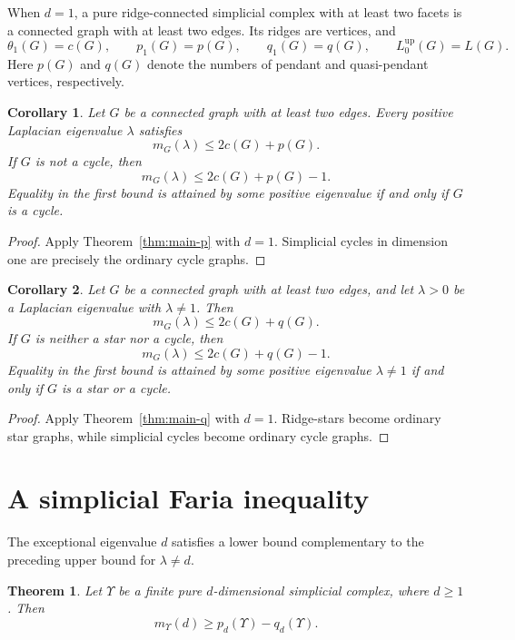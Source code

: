 \documentclass[12pt]{article}
\newtheorem{theorem}{Theorem}
\newtheorem{corollary}{Corollary}
\theoremstyle{remark}
\begin{document}
When $d=1$, a pure ridge-connected simplicial complex with at least two facets is a connected graph with at least two edges.  Its ridges are vertices, and
\[
\theta_1(G)=c(G),\qquad
p_1(G)=p(G),\qquad
q_1(G)=q(G),\qquad
L^{\mathrm{up}}_0(G)=L(G).
\]
Here $p(G)$ and $q(G)$ denote the numbers of pendant and quasi-pendant vertices, respectively.

\begin{corollary}\label{cor:graph-p}
Let $G$ be a connected graph with at least two edges.  Every positive Laplacian eigenvalue $\lambda$ satisfies
\[
m_G(\lambda)\le2c(G)+p(G).
\]
If $G$ is not a cycle, then
\[
m_G(\lambda)\le2c(G)+p(G)-1.
\]
Equality in the first bound is attained by some positive eigenvalue if and only if $G$ is a cycle.
\end{corollary}

\begin{proof}
Apply Theorem~\ref{thm:main-p} with $d=1$.  Simplicial cycles in dimension one are precisely the ordinary cycle graphs.
\end{proof}

\begin{corollary}\label{cor:graph-q}
Let $G$ be a connected graph with at least two edges, and let $\lambda>0$ be a Laplacian eigenvalue with $\lambda\ne1$.  Then
\[
m_G(\lambda)\le2c(G)+q(G).
\]
If $G$ is neither a star nor a cycle, then
\[
m_G(\lambda)\le2c(G)+q(G)-1.
\]
Equality in the first bound is attained by some positive eigenvalue $\lambda\ne1$ if and only if $G$ is a star or a cycle.
\end{corollary}

\begin{proof}
Apply Theorem~\ref{thm:main-q} with $d=1$.  Ridge-stars become ordinary star graphs, while simplicial cycles become ordinary cycle graphs.
\end{proof}

\section{A simplicial Faria inequality}

The exceptional eigenvalue $d$ satisfies a lower bound complementary to the preceding upper bound for $\lambda\ne d$.

\begin{theorem}\label{thm:simplicial-faria}
Let $\Upsilon$ be a finite pure $d$-dimensional simplicial complex, where $d\ge1$.  Then
\[
m_{\Upsilon}(d)\ge p_d(\Upsilon)-q_d(\Upsilon).
\]
\end{theorem}
\end{document}
